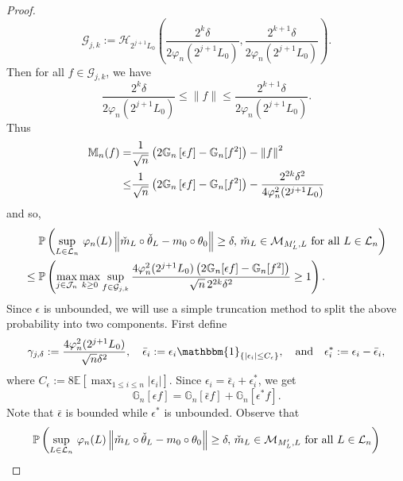 \begin{proof}
\begin{equation}\label{eq:G_def}
\mathcal{G}_{j, k} := \mathcal{H}_{2^{j+1}L_0}\left(\frac{2^k\delta}{2\varphi_n(2^{j+1}L_0)}, \frac{2^{k+1}\delta}{2\varphi_n(2^{j+1}L_0)}\right).
\end{equation}
Then for all $f\in \mathcal{G}_{j,k}$, we have
\begin{equation}\label{eq:f_bound}
\frac{2^k\delta}{2\varphi_n(2^{j+1}L_0)} \le \|f\| \le \frac{2^{k+1}\delta}{2\varphi_n(2^{j+1}L_0)}.
\end{equation}
Thus
\begin{align}\label{eq:MtoG}
\begin{split}
\mathbb{M}_n(f) =& \frac{1}{\sqrt{n}}\left(2\mathbb{G}_n\left[\epsilon f\right]  - \mathbb{G}_n[f^2]\right) - \left\lVert f\right\rVert^2 \\
\le& \frac{1}{\sqrt{n}}\left(2\mathbb{G}_n\left[\epsilon f\right]  - \mathbb{G}_n[f^2]\right) -\frac{2^{2k}\delta^2}{4\varphi_n^2(2^{j+1}L_0)}
\end{split}
\end{align}
and so,
\begin{align*}
&\mathbb{P}\left(\sup_{L\in\mathcal{L}_n}\,\varphi_n(L)\left\lVert\check{m}_L\circ\check{\theta}_L - m_0\circ\theta_0\right\rVert \ge \delta,\,\check{m}_L\in\mathcal{M}_{M'_L, L}\mbox{ for all }L\in\mathcal{L}_n\right)\\
\le{}&\mathbb{P}\left(\max_{j\in \mathcal{J}_n}\max_{k \ge 0}\sup_{f\in\mathcal{G}_{j,k}} \frac{4\varphi_n^2(2^{j+1}L_0)\left(2\mathbb{G}_n[\epsilon f] - \mathbb{G}_n[f^2]\right)}{\sqrt{n}\,2^{2k}\delta^2} \ge 1\right).
\end{align*}
Since $\epsilon$ is unbounded, we will use a simple truncation method to split the above probability into two components. First define
\begin{equation}\label{eq:basic_defs}
\gamma_{j,\delta} := \frac{4\varphi_n^2(2^{j+1}L_0)}{\sqrt{n}\delta^2},\quad\bar\epsilon_{i} := \epsilon_i\mathbbm{1}_{\{|\epsilon_i|\le C_{\epsilon}\}},\quad\mbox{and}\quad \epsilon^*_{i} := \epsilon_i - \bar\epsilon_{i}, 
\end{equation}
where $C_{\epsilon} := 8\mathbb{E}\left[\max_{1\le i\le n}|\epsilon_i|\right]$. Since $\epsilon_i = \bar\epsilon_{i} + \epsilon^*_{i}$, we get
\[
\mathbb{G}_n\left[\epsilon f\right] = \mathbb{G}_n\left[\bar\epsilon  f\right] + \mathbb{G}_n\left[\epsilon^* f\right].
\]
Note that $\bar\epsilon $ is bounded while $\epsilon^*$ is unbounded. Observe that
\begin{align*}
&\mathbb{P}\left(\sup_{L\in\mathcal{L}_n}\,\varphi_n(L)\norm{\check{m}_L\circ\check{\theta}_L - m_0\circ\theta_0} \ge \delta,\,\check{m}_L\in\mathcal{M}_{M'_L, L}\mbox{ for all }L \in \mathcal{L}_n\right)\\

\end{align*}
\end{proof}
